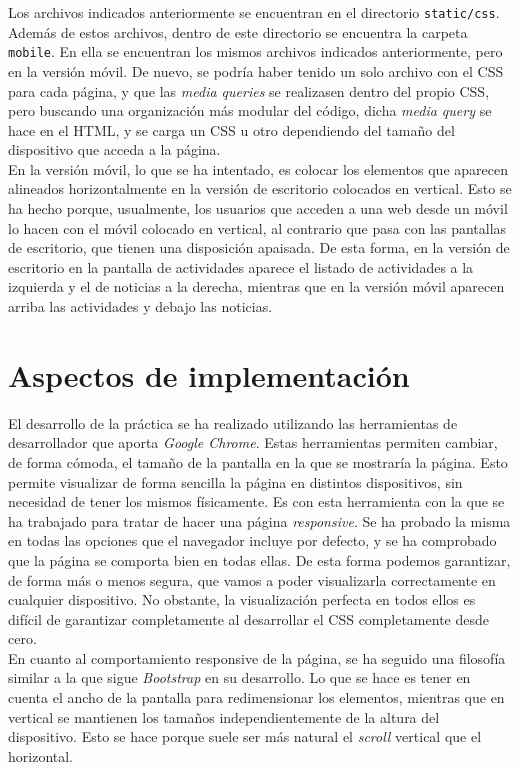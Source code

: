 \documentclass[11pt]{article}
\theoremstyle{plain}
\theoremstyle{definition}
\begin{document}
Los archivos indicados anteriormente se encuentran en el directorio
\texttt{static/css}. Además de estos archivos, dentro de este
directorio se encuentra la carpeta \texttt{mobile}. En ella se
encuentran los mismos archivos indicados anteriormente, pero en la
versión móvil. De nuevo, se podría haber tenido un solo archivo con el
CSS para cada página, y que las \textit{media queries} se realizasen
dentro del propio CSS, pero buscando una organización más modular del
código, dicha \textit{media query} se hace en el HTML, y se carga un
CSS u otro dependiendo del tamaño del dispositivo que acceda a la
página.\\

En la versión móvil, lo que se ha intentado, es colocar los elementos
que aparecen alineados horizontalmente en la versión de escritorio
colocados en vertical. Esto se ha hecho porque, usualmente, los usuarios
que acceden a una web desde un móvil lo hacen con el móvil colocado
en vertical, al contrario que pasa con las pantallas de escritorio,
que tienen una disposición apaisada. De esta forma, en la versión
de escritorio en la pantalla de actividades aparece el listado de
actividades a la izquierda y el de noticias a la derecha, mientras
que en la versión móvil aparecen arriba las actividades y debajo las
noticias.

\section{Aspectos de implementación}

El desarrollo de la práctica se ha realizado utilizando las
herramientas de desarrollador que aporta \textit{Google Chrome}. Estas
herramientas permiten cambiar, de forma cómoda, el tamaño de la
pantalla en la que se mostraría la página. Esto permite visualizar de
forma sencilla la página en distintos dispositivos, sin necesidad de
tener los mismos físicamente. Es con esta herramienta con la que se ha
trabajado para tratar de hacer una página \textit{responsive}.  Se ha
probado la misma en todas las opciones que el navegador incluye por
defecto, y se ha comprobado que la página se comporta bien en todas
ellas. De esta forma podemos garantizar, de forma más o menos segura,
que vamos a poder visualizarla correctamente en cualquier dispositivo.
No obstante, la visualización perfecta en todos ellos es difícil de
garantizar completamente al desarrollar el CSS completamente desde
cero.\\

En cuanto al comportamiento responsive de la página, se ha seguido una
filosofía similar a la que sigue \textit{Bootstrap} en su desarrollo.
Lo que se hace es tener en cuenta el ancho de la pantalla para
redimensionar los elementos, mientras que en vertical se mantienen
los tamaños independientemente de la altura del dispositivo. Esto se
hace porque suele ser más natural el \textit{scroll} vertical que
el horizontal.
\end{document}
